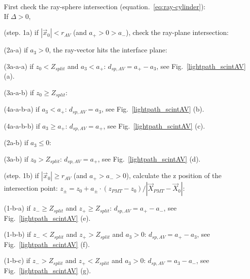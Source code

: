\begin{algorithm}
	First check the ray-sphere intersection (equation.~\ref{eq:ray-cylinder}):\\
	If {$\Delta>0$}, 
	
	\hspace{2mm}(step. 1a) if $|\vec{x}_0|<r_{AV}$ (and $a_+>0>a_-$), check the ray-plane intersection:
	
	\hspace{4mm}(2a-a) if $a_3>0$, the ray-vector hits the interface plane: 
	
	\hspace{6mm}(3a-a-a) if $z_0<Z_{split}$ and $a_3<a_+$: $d_{sp,AV}=a_+-a_3$, see Fig.~\ref{lightpath_scintAV} (a).
	
	\hspace{6mm}(3a-a-b) if $z_0\geq Z_{split}$:
	
	\hspace{8mm}(4a-a-b-a) if $a_3<a_+$:  $d_{sp,AV}=a_3$, see Fig.~\ref{lightpath_scintAV} (b). 
	
	\hspace{8mm}(4a-a-b-b) if $a_3\geq a_+$:  $d_{sp,AV}=a_+$, see Fig.~\ref{lightpath_scintAV} (c).
	
	\hspace{4mm}(2a-b) if $a_3\leq0$:
	
	\hspace{6mm}(3a-b) if $z_0>Z_{split}$: $d_{sp,AV}=a_+$, see Fig.~\ref{lightpath_scintAV} (d).
	
	\hspace{2mm}(step. 1b) if $|\vec{x}_0|\geq r_{AV}$ (and $a_+>a_->0$), calculate the z position of the intersection point: $z_{\pm}=z_0+a_\pm\cdot(z_{PMT}-z_0)/|\vec{X}_{PMT}-\vec{X}_0|$:
	
	\hspace{4mm}(1-b-a) if $z_- \geq Z_{split}$ and $z_+\geq Z_{split}$: $d_{sp,AV} = a_+ - a_-$, see Fig.~\ref{lightpath_scintAV} (e).
	
	\hspace{4mm}(1-b-b) if $z_-< Z_{split}$ and $z_+> Z_{split}$ and $a_3>0$: $d_{sp,AV} = a_+ - a_3$, see Fig.~\ref{lightpath_scintAV} (f).
	
	\hspace{4mm}(1-b-c) if $z_->Z_{split}$ and $z_+<Z_{split}$ and $a_3>0$: $d_{sp,AV}= a_3 - a_-$, see Fig.~\ref{lightpath_scintAV} (g).
\end{algorithm}

